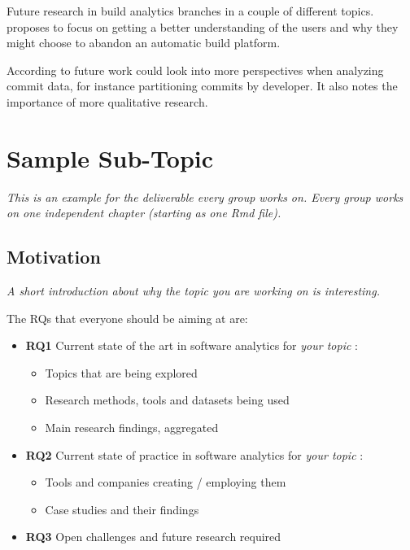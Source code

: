 \documentclass[]{book}
\providecommand{\tightlist}{%
  \setlength{\itemsep}{0pt}\setlength{\parskip}{0pt}}
\begin{document}
Future research in build analytics branches in a couple of different
topics. \citet{pinto2018work} proposes to focus on getting a better
understanding of the users and why they might choose to abandon an
automatic build platform.

According to \citet{baltes2018no} future work could look into more
perspectives when analyzing commit data, for instance partitioning
commits by developer. It also notes the importance of more qualitative
research.

\chapter{Sample Sub-Topic}\label{sample-sub-topic}

\emph{This is an example for the deliverable every group works on. Every
group works on one independent chapter (starting as one Rmd file).}

\section{Motivation}\label{motivation-1}

\emph{A short introduction about why the topic you are working on is
interesting.}

The RQs that everyone should be aiming at are:

\begin{itemize}
\tightlist
\item
  \textbf{RQ1} Current state of the art in software analytics for
  \emph{your topic }:

  \begin{itemize}
  \tightlist
  \item
    Topics that are being explored
  \item
    Research methods, tools and datasets being used
  \item
    Main research findings, aggregated
  \end{itemize}
\item
  \textbf{RQ2} Current state of practice in software analytics for
  \emph{your topic }:

  \begin{itemize}
  \tightlist
  \item
    Tools and companies creating / employing them
  \item
    Case studies and their findings
  \end{itemize}
\item
  \textbf{RQ3} Open challenges and future research required
\end{itemize}
\end{document}
